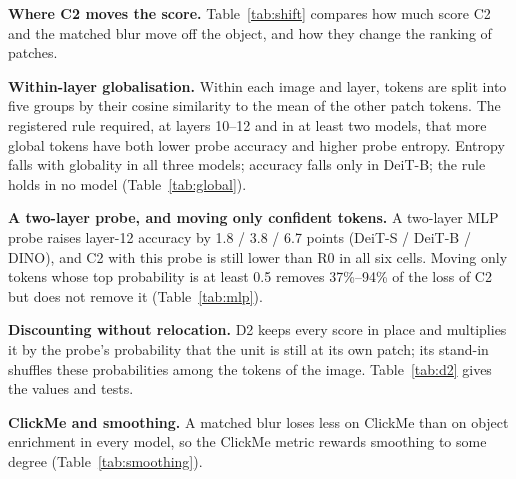 

\textbf{Where C2 moves the score.} Table~\ref{tab:shift} compares how much score C2 and the matched blur move off the object, and how they change the ranking of patches.



\textbf{Within-layer globalisation.} Within each image and layer, tokens are split into five groups by their cosine similarity to the mean of the other patch tokens. The registered rule required, at layers 10--12 and in at least two models, that more global tokens have both lower probe accuracy and higher probe entropy. Entropy falls with globality in all three models; accuracy falls only in DeiT-B; the rule holds in no model (Table~\ref{tab:global}).



\textbf{A two-layer probe, and moving only confident tokens.} A two-layer MLP probe raises layer-12 accuracy by 1.8 / 3.8 / 6.7 points (DeiT-S / DeiT-B / DINO), and C2 with this probe is still lower than R0 in all six cells. Moving only tokens whose top probability is at least 0.5 removes 37\%--94\% of the loss of C2 but does not remove it (Table~\ref{tab:mlp}).



\textbf{Discounting without relocation.} D2 keeps every score in place and multiplies it by the probe's probability that the unit is still at its own patch; its stand-in shuffles these probabilities among the tokens of the image. Table~\ref{tab:d2} gives the values and tests.



\textbf{ClickMe and smoothing.} A matched blur loses less on ClickMe than on object enrichment in every model, so the ClickMe metric rewards smoothing to some degree (Table~\ref{tab:smoothing}).



